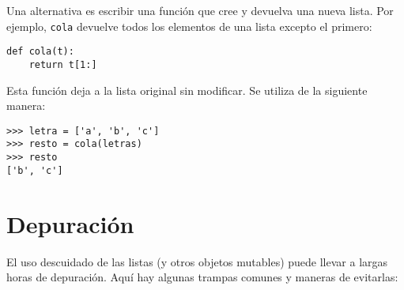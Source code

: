 \documentclass[10pt]{book}
\begin{document}
Una alternativa es escribir una función que cree y
devuelva una nueva lista.  Por
ejemplo, {\tt cola} devuelve todos los elementos
de una lista excepto el primero:

\begin{verbatim}
def cola(t):
    return t[1:]
\end{verbatim}
%
Esta función deja a la lista original sin modificar.
Se utiliza de la siguiente manera:

\begin{verbatim}
>>> letra = ['a', 'b', 'c']
>>> resto = cola(letras)
>>> resto
['b', 'c']
\end{verbatim}



\section{Depuración}

El uso descuidado de las listas (y otros objetos mutables)
puede llevar a largas horas de depuración.  Aquí hay algunas
trampas comunes y maneras de evitarlas:
\end{document}
